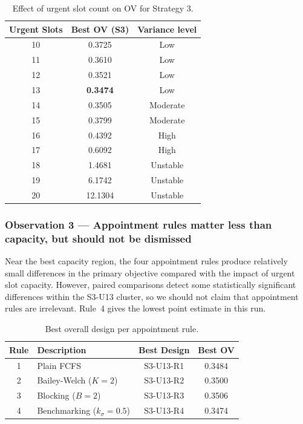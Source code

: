 \documentclass[12pt, a4paper]{article}
\newcommand{\headerrow}{\rowcolor{ugblue}\color{white}}
\newcommand{\altrow}{\rowcolor{rowgray}}
\begin{document}
\begin{table}[ht]
\centering
\caption{Effect of urgent slot count on OV for Strategy 3.}
\label{tab:urgent_effect}
\small
\begin{tabular}{ccc}
\toprule
\headerrow \textbf{Urgent Slots} & \textbf{Best OV (S3)} & \textbf{Variance level} \\
\midrule
10 & 0.3725 & Low \\
\altrow 11 & 0.3610 & Low \\
12 & 0.3521 & Low \\
\altrow 13 & \textbf{0.3474} & Low \\
14 & 0.3505 & Moderate \\
\altrow 15 & 0.3799 & Moderate \\
16 & 0.4392 & High \\
\altrow 17 & 0.6092 & High \\
18 & 1.4681 & Unstable \\
\altrow 19 & 6.1742 & Unstable \\
20 & 12.1304 & Unstable \\
\bottomrule
\end{tabular}
\end{table}

\subsubsection{Observation 3 --- Appointment rules matter less than capacity, but should not be dismissed}

Near the best capacity region, the four appointment rules produce relatively small differences in the primary objective compared with the impact of urgent slot capacity. However, paired comparisons detect some statistically significant differences within the S3-U13 cluster, so we should not claim that appointment rules are irrelevant. Rule~4 gives the lowest point estimate in this run.

\begin{table}[ht]
\centering
\caption{Best overall design per appointment rule.}
\label{tab:per_rule}
\small
\begin{tabular}{clcc}
\toprule
\headerrow \textbf{Rule} & \textbf{Description} & \textbf{Best Design} & \textbf{Best OV} \\
\midrule
1 & Plain FCFS      & S3-U13-R1 & 0.3484 \\
\altrow 2 & Bailey-Welch ($K=2$) & S3-U13-R2 & 0.3500 \\
3 & Blocking ($B=2$) & S3-U13-R3 & 0.3506 \\
\altrow 4 & Benchmarking ($k_\sigma=0.5$) & S3-U13-R4 & 0.3474 \\
\bottomrule
\end{tabular}
\end{table}
\end{document}
